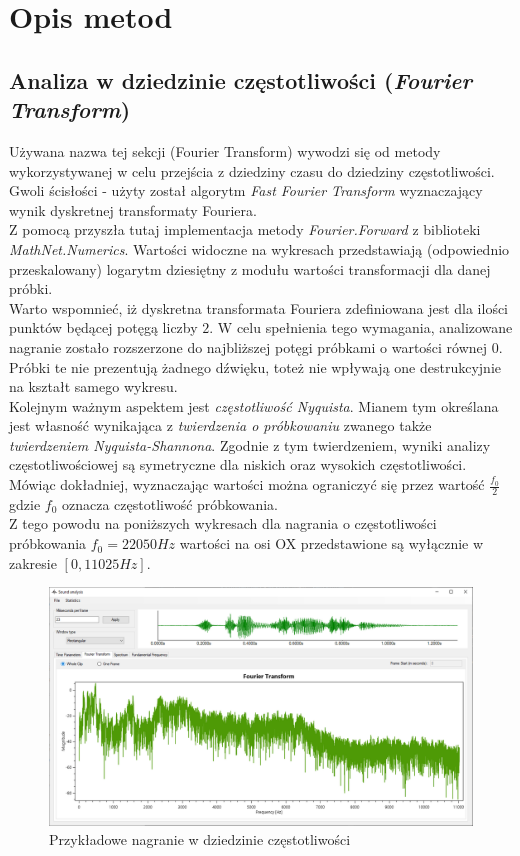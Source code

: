 \documentclass[a4paper]{article}
\begin{document}
\section{Opis metod}
\subsection{Analiza w dziedzinie częstotliwości (\textit{Fourier Transform})}
Używana nazwa tej sekcji (Fourier Transform) wywodzi się od metody wykorzystywanej w celu przejścia z dziedziny czasu do dziedziny częstotliwości.\\
Gwoli ścisłości - użyty został algorytm \textit{Fast Fourier Transform} wyznaczający wynik dyskretnej transformaty Fouriera.\\
Z pomocą przyszła tutaj implementacja metody \textit{Fourier.Forward} z biblioteki \textit{MathNet.Numerics}. Wartości widoczne na wykresach przedstawiają (odpowiednio przeskalowany) logarytm dziesiętny z modułu wartości transformacji dla danej próbki.\\
Warto wspomnieć, iż dyskretna transformata Fouriera zdefiniowana jest dla ilości punktów będącej potęgą liczby $2$. W celu spełnienia tego wymagania, analizowane nagranie zostało rozszerzone do najbliższej potęgi próbkami o wartości równej $0$. Próbki te nie prezentują żadnego dźwięku, toteż nie wpływają one destrukcyjnie na kształt samego wykresu.\\
Kolejnym ważnym aspektem jest \textit{częstotliwość Nyquista}. Mianem tym określana jest własność wynikająca z \textit{twierdzenia o próbkowaniu} zwanego także \textit{twierdzeniem Nyquista-Shannona}. Zgodnie z tym twierdzeniem, wyniki analizy częstotliwościowej są symetryczne dla niskich oraz wysokich częstotliwości. Mówiąc dokładniej, wyznaczając wartości można ograniczyć się przez wartość $\frac{f_0}{2}$ gdzie $f_0$ oznacza częstotliwość próbkowania.\\
Z tego powodu na poniższych wykresach dla nagrania o częstotliwości próbkowania $f_0 = 22 050Hz$ wartości na osi OX przedstawione są wyłącznie w zakresie $[0, 11 025Hz]$.
\begin{figure}[H]
  \includegraphics[width=\linewidth]{images/02fourier.png}
  \caption{Przykładowe nagranie w dziedzinie częstotliwości}
\end{figure}
\end{document}
